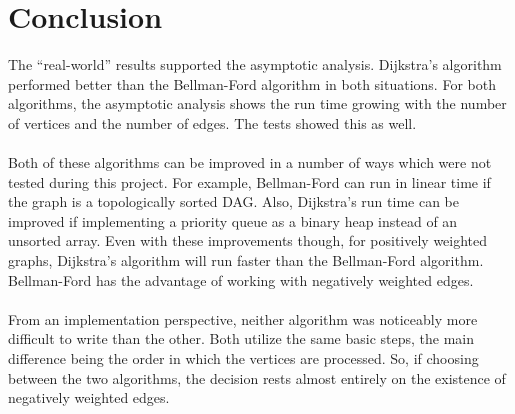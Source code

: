 \documentclass{article}
\begin{document}
\section*{Conclusion}
The ``real-world'' results supported the asymptotic analysis. Dijkstra's algorithm performed better than the Bellman-Ford algorithm in both situations. For both algorithms, the asymptotic analysis shows the run time growing with the number of vertices and the number of edges. The tests showed this as well.
\\ \ \\
Both of these algorithms can be improved in a number of ways which were not tested during this project. For example, Bellman-Ford can run in linear time if the graph is a topologically sorted DAG. Also, Dijkstra's run time can be improved if implementing a priority queue as a binary heap instead of an unsorted array. Even with these improvements though,  for positively weighted graphs, Dijkstra's algorithm will run faster than the Bellman-Ford algorithm. Bellman-Ford has the advantage of working with negatively weighted edges.
\\ \ \\
From an implementation perspective, neither algorithm was noticeably more difficult to write than the other. Both utilize the same basic steps, the main difference being the order in which the vertices are processed. So, if choosing between the two algorithms, the decision rests almost entirely on the existence of negatively weighted edges. 
\end{document}
